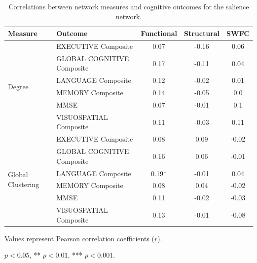 \begin{table}[htbp]
\centering
\begin{threeparttable}
\caption{Correlations between network measures and cognitive outcomes for the salience network.}
\small
\begin{tabular}{llccc}
\toprule
Measure & Outcome & Functional & Structural & SWFC \\
\midrule
\multirow{6}{*}{Degree} & EXECUTIVE Composite & 0.07 & -0.16 & 0.06 \\
& GLOBAL COGNITIVE Composite & 0.17 & -0.11 & 0.04 \\
& LANGUAGE Composite & 0.12 & -0.02 & 0.01 \\
& MEMORY Composite & 0.14 & -0.05 & 0.0 \\
& MMSE & 0.07 & -0.01 & 0.1 \\
& VISUOSPATIAL Composite & 0.11 & -0.03 & 0.11 \\
\midrule
\multirow{6}{*}{Global Clustering} & EXECUTIVE Composite & 0.08 & 0.09 & -0.02 \\
& GLOBAL COGNITIVE Composite & 0.16 & 0.06 & -0.01 \\
& LANGUAGE Composite & 0.19* & -0.01 & 0.04 \\
& MEMORY Composite & 0.08 & 0.04 & -0.02 \\
& MMSE & 0.11 & -0.02 & -0.03 \\
& VISUOSPATIAL Composite & 0.13 & -0.01 & -0.08 \\
\bottomrule
\end{tabular}
\begin{tablenotes}
\footnotesize
\item Values represent Pearson correlation coefficients ($r$).
\item * $p<0.05$, ** $p<0.01$, *** $p<0.001$.
\end{tablenotes}
\end{threeparttable}
\end{table}


